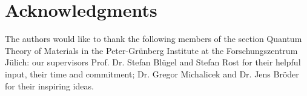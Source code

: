 \chapter*{Acknowledgments}

The authors would like to thank the following members of the section Quantum
Theory of Materials in the Peter-Grünberg Institute at the Forschungszentrum
Jülich: our supervisors Prof. Dr. Stefan Blügel and Stefan Rost for their
helpful input, their time and commitment; Dr. Gregor Michalicek and Dr. Jens
Bröder for their inspiring ideas. 

